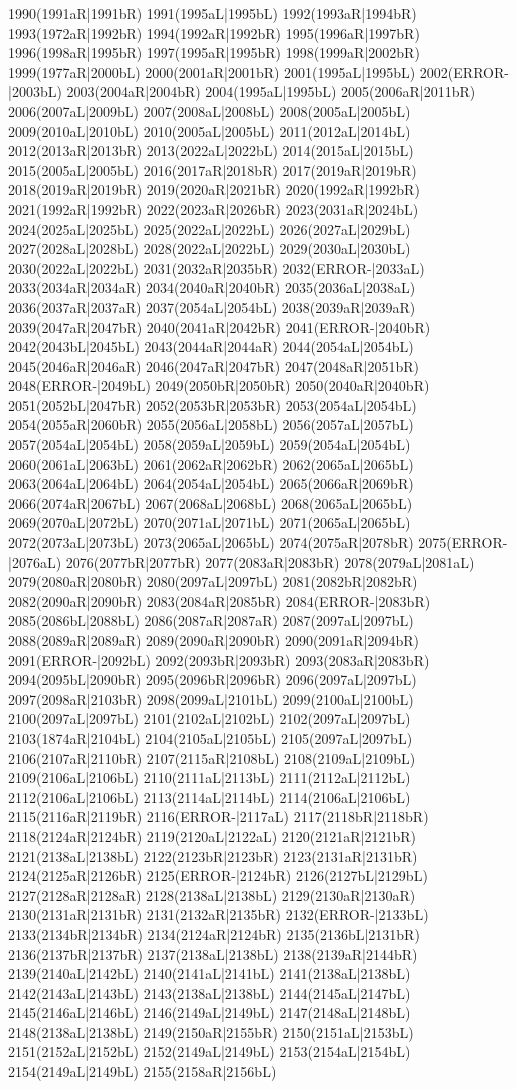 1990(1991aR|1991bR) 1991(1995aL|1995bL) 1992(1993aR|1994bR) 1993(1972aR|1992bR) 1994(1992aR|1992bR) 1995(1996aR|1997bR) 1996(1998aR|1995bR) 1997(1995aR|1995bR) 1998(1999aR|2002bR) 1999(1977aR|2000bL) 2000(2001aR|2001bR) 2001(1995aL|1995bL) 2002(ERROR-|2003bL) 2003(2004aR|2004bR) 2004(1995aL|1995bL) 2005(2006aR|2011bR) 2006(2007aL|2009bL) 2007(2008aL|2008bL) 2008(2005aL|2005bL) 2009(2010aL|2010bL) 2010(2005aL|2005bL) 2011(2012aL|2014bL) 2012(2013aR|2013bR) 2013(2022aL|2022bL) 2014(2015aL|2015bL) 2015(2005aL|2005bL) 2016(2017aR|2018bR) 2017(2019aR|2019bR) 2018(2019aR|2019bR) 2019(2020aR|2021bR) 2020(1992aR|1992bR) 2021(1992aR|1992bR) 2022(2023aR|2026bR) 2023(2031aR|2024bL) 2024(2025aL|2025bL) 2025(2022aL|2022bL) 2026(2027aL|2029bL) 2027(2028aL|2028bL) 2028(2022aL|2022bL) 2029(2030aL|2030bL) 2030(2022aL|2022bL) 2031(2032aR|2035bR) 2032(ERROR-|2033aL) 2033(2034aR|2034aR) 2034(2040aR|2040bR) 2035(2036aL|2038aL) 2036(2037aR|2037aR) 2037(2054aL|2054bL) 2038(2039aR|2039aR) 2039(2047aR|2047bR) 2040(2041aR|2042bR) 2041(ERROR-|2040bR) 2042(2043bL|2045bL) 2043(2044aR|2044aR) 2044(2054aL|2054bL) 2045(2046aR|2046aR) 2046(2047aR|2047bR) 2047(2048aR|2051bR) 2048(ERROR-|2049bL) 2049(2050bR|2050bR) 2050(2040aR|2040bR) 2051(2052bL|2047bR) 2052(2053bR|2053bR) 2053(2054aL|2054bL) 2054(2055aR|2060bR) 2055(2056aL|2058bL) 2056(2057aL|2057bL) 2057(2054aL|2054bL) 2058(2059aL|2059bL) 2059(2054aL|2054bL) 2060(2061aL|2063bL) 2061(2062aR|2062bR) 2062(2065aL|2065bL) 2063(2064aL|2064bL) 2064(2054aL|2054bL) 2065(2066aR|2069bR) 2066(2074aR|2067bL) 2067(2068aL|2068bL) 2068(2065aL|2065bL) 2069(2070aL|2072bL) 2070(2071aL|2071bL) 2071(2065aL|2065bL) 2072(2073aL|2073bL) 2073(2065aL|2065bL) 2074(2075aR|2078bR) 2075(ERROR-|2076aL) 2076(2077bR|2077bR) 2077(2083aR|2083bR) 2078(2079aL|2081aL) 2079(2080aR|2080bR) 2080(2097aL|2097bL) 2081(2082bR|2082bR) 2082(2090aR|2090bR) 2083(2084aR|2085bR) 2084(ERROR-|2083bR) 2085(2086bL|2088bL) 2086(2087aR|2087aR) 2087(2097aL|2097bL) 2088(2089aR|2089aR) 2089(2090aR|2090bR) 2090(2091aR|2094bR) 2091(ERROR-|2092bL) 2092(2093bR|2093bR) 2093(2083aR|2083bR) 2094(2095bL|2090bR) 2095(2096bR|2096bR) 2096(2097aL|2097bL) 2097(2098aR|2103bR) 2098(2099aL|2101bL) 2099(2100aL|2100bL) 2100(2097aL|2097bL) 2101(2102aL|2102bL) 2102(2097aL|2097bL) 2103(1874aR|2104bL) 2104(2105aL|2105bL) 2105(2097aL|2097bL) 2106(2107aR|2110bR) 2107(2115aR|2108bL) 2108(2109aL|2109bL) 2109(2106aL|2106bL) 2110(2111aL|2113bL) 2111(2112aL|2112bL) 2112(2106aL|2106bL) 2113(2114aL|2114bL) 2114(2106aL|2106bL) 2115(2116aR|2119bR) 2116(ERROR-|2117aL) 2117(2118bR|2118bR) 2118(2124aR|2124bR) 2119(2120aL|2122aL) 2120(2121aR|2121bR) 2121(2138aL|2138bL) 2122(2123bR|2123bR) 2123(2131aR|2131bR) 2124(2125aR|2126bR) 2125(ERROR-|2124bR) 2126(2127bL|2129bL) 2127(2128aR|2128aR) 2128(2138aL|2138bL) 2129(2130aR|2130aR) 2130(2131aR|2131bR) 2131(2132aR|2135bR) 2132(ERROR-|2133bL) 2133(2134bR|2134bR) 2134(2124aR|2124bR) 2135(2136bL|2131bR) 2136(2137bR|2137bR) 2137(2138aL|2138bL) 2138(2139aR|2144bR) 2139(2140aL|2142bL) 2140(2141aL|2141bL) 2141(2138aL|2138bL) 2142(2143aL|2143bL) 2143(2138aL|2138bL) 2144(2145aL|2147bL) 2145(2146aL|2146bL) 2146(2149aL|2149bL) 2147(2148aL|2148bL) 2148(2138aL|2138bL) 2149(2150aR|2155bR) 2150(2151aL|2153bL) 2151(2152aL|2152bL) 2152(2149aL|2149bL) 2153(2154aL|2154bL) 2154(2149aL|2149bL) 2155(2158aR|2156bL) 